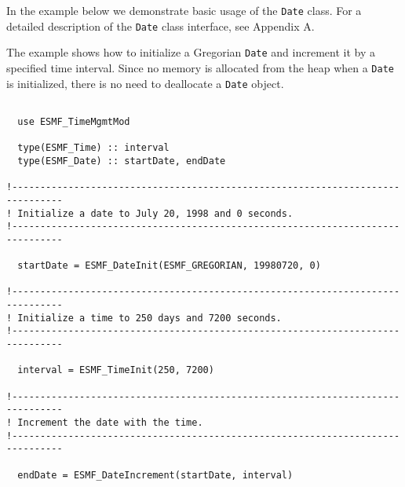 
In the example below we demonstrate basic usage of the {\tt Date} class.  For
a detailed description of the {\tt Date} class interface, see 
Appendix A.

The example shows how to initialize a Gregorian {\tt Date} and increment 
it by a specified time interval.  Since no memory is allocated from the heap
when a {\tt Date} is initialized, there is no need to deallocate a 
{\tt Date} object.

\begin{verbatim}

  use ESMF_TimeMgmtMod

  type(ESMF_Time) :: interval
  type(ESMF_Date) :: startDate, endDate

!-------------------------------------------------------------------------------    
! Initialize a date to July 20, 1998 and 0 seconds. 
!-------------------------------------------------------------------------------

  startDate = ESMF_DateInit(ESMF_GREGORIAN, 19980720, 0) 

!-------------------------------------------------------------------------------    
! Initialize a time to 250 days and 7200 seconds. 
!-------------------------------------------------------------------------------

  interval = ESMF_TimeInit(250, 7200)

!-------------------------------------------------------------------------------    
! Increment the date with the time. 
!-------------------------------------------------------------------------------
       
  endDate = ESMF_DateIncrement(startDate, interval)
\end{verbatim}




